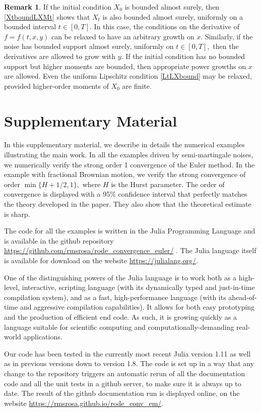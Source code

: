 \documentclass[reqno,12pt]{amsart}
\theoremstyle{plain} %
\theoremstyle{definition} %
\newtheorem{remark}{Remark}[section]
\begin{document}
\begin{remark}
    If the initial condition $X_0$ is bounded almost surely, then \cref{XtboundLXMt} shows that $X_t$ is also bounded almost surely, uniformly on a bounded interval $t\in [0, T].$ In this case, the conditions on the derivative of $f=f(t, x, y)$ can be relaxed to have an arbitrary growth on $x$. Similarly, if the noise has bounded support almost surely, uniformly on $t\in [0, T],$ then the derivatives are allowed to grow with $y$. If the initial condition has no bounded support but higher moments are bounded, then appropriate power growths on $x$ are allowed. Even the uniform Lipschitz condition \cref{LtLXbound} may be relaxed, provided higher-order moments of $X_0$ are finite.
\end{remark}

\section{Supplementary Material}
\label{secsupplementary}

In this supplementary material, we describe in details the numerical examples illustrating the main work. In all the examples driven by semi-martingale noises, we numerically verify the strong order 1 convergence of the Euler method. In the example with fractional Brownian motion, we verify the strong convergence of order $\min\{H+1/2, 1\},$ where $H$ is the Hurst parameter. The order of convergence is displayed with a 95\% confidence interval that perfectly matches the theory developed in the paper. They also show that the theoretical estimate is sharp.

The code for all the examples is written in the Julia Programming Language \cite{Julia2017} and is available in the github repository \url{https://github.com/rmsrosa/rode_convergence_euler/} \cite{RODEConvEM2023}. The Julia language itself is available for download on the website \url{https://julialang.org/}.

One of the distinguishing powers of the Julia language is to work both as a high-level, interactive, scripting language (with its dynamically typed and just-in-time compilation system), and as a fast, high-performance language (with its ahead-of-time and aggressive compilation capabilities). It allows for both easy prototyping and the production of efficient end code. As such, it is growing quickly as a language suitable for scientific computing and computationally-demanding real-world applications.

Our code has been tested in the currently most recent Julia version 1.11 as well as in previous versions down to version 1.8. The code is set up in a way that any change to the repository triggers an automatic rerun of all the documentation code and all the unit tests in a github server, to make sure it is always up to date. The result of the github documentation run is displayed online, on the website \url{https://rmsrosa.github.io/rode_conv_em/}.
\end{document}
